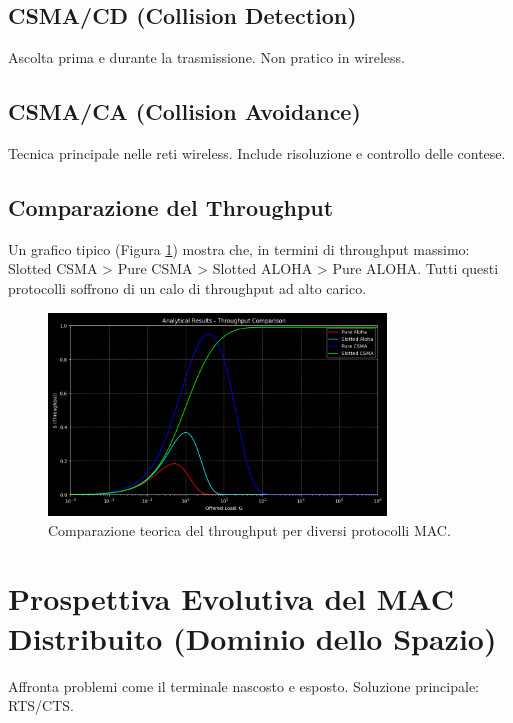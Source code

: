 \documentclass{article}
\begin{document}
\subsection{CSMA/CD (Collision Detection)}
Ascolta prima e durante la trasmissione. Non pratico in wireless.

\subsection{CSMA/CA (Collision Avoidance)}
Tecnica principale nelle reti wireless. Include risoluzione e controllo delle contese.

\subsection{Comparazione del Throughput}
Un grafico tipico (Figura \ref{fig:throughput_comparison}) mostra che, in termini di throughput massimo:
Slotted CSMA > Pure CSMA > Slotted ALOHA > Pure ALOHA.
Tutti questi protocolli soffrono di un calo di throughput ad alto carico.

\begin{figure}[H]
\centering
\includegraphics[width=0.8\textwidth]{images/throughput_comparison.png}
\caption{Comparazione teorica del throughput per diversi protocolli MAC.}
\label{fig:throughput_comparison}
\end{figure}


\section{Prospettiva Evolutiva del MAC Distribuito (Dominio dello Spazio)}
Affronta problemi come il terminale nascosto e esposto. Soluzione principale: RTS/CTS.
\end{document}
